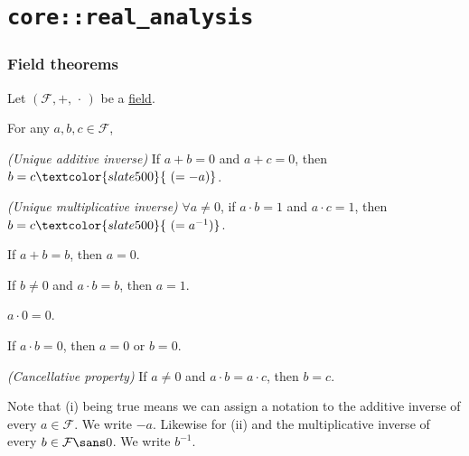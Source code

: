 \chapter{\texttt{core::real\_analysis}}\label{fc4a0b3}

\begin{toc}
\end{toc}

\subsection{Field theorems}\label{e3f40a4}

\label{a1bdcab}

Let $(\mathcal F,+,\,\cdot\,)$ be a \href{aec6040}{field}.

For any $a,b,c\in\mathcal F$,
\begin{enumerati}
  \item \textit{(Unique additive inverse)} If $a+b=0$ and $a+c=0$, then
  $b=c\textcolor{slate500}{\ (=-a)}$.
  \item \textit{(Unique multiplicative inverse)} $\forall a\neq0$, if
  $a\cdot b=1$ and $a\cdot c=1$, then $b=c\textcolor{slate500}{\ (=a^{-1})}$.
  \item If $a+b=b$, then $a=0$.
  \item If $b\neq0$ and $a\cdot b=b$, then $a=1$.
  \item $a\cdot0=0$.
  \item If $a\cdot b=0$, then $a=0$ or $b=0$.
  \item \textit{(Cancellative property)} If $a\neq0$ and $a\cdot b=a\cdot c$, then $b=c$.
\end{enumerati}

Note that (i) being true means we can assign a notation to the additive inverse
of every $a\in\mathcal F$. We write $-a$. Likewise for (ii) and the
multiplicative inverse of every $b\in\mathcal F\sans0$. We write $b^{-1}$.

